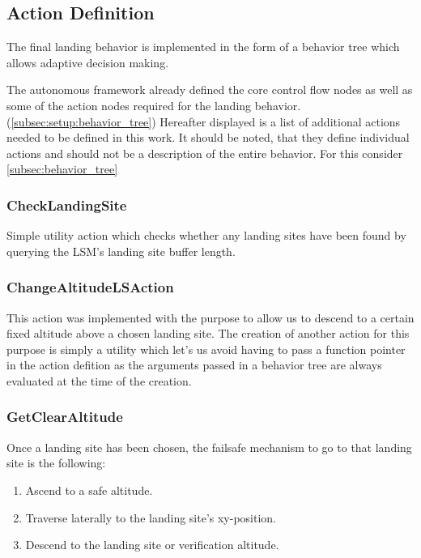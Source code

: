 \subsection{Action Definition}
The final landing behavior is implemented in the form of a behavior tree which allows adaptive decision making.

The autonomous framework already defined the core control flow nodes as well as some of the action nodes required for the landing behavior. (\ref{subsec:setup:behavior_tree}) Hereafter displayed is a list of additional actions needed to be defined in this work. It should be noted, that they define individual actions and should not be a description of the entire behavior. For this consider \cref{subsec:behavior_tree}

\subsubsection{CheckLandingSite}

Simple utility action which checks whether any landing sites have been found by querying the LSM's landing site buffer length.

\subsubsection{ChangeAltitudeLSAction}

This action was implemented with the purpose to allow us to descend to a certain fixed altitude above a chosen landing site. The creation of another action for this purpose is simply a utility which let's us avoid having to pass a function pointer in the action defition as the arguments passed in a behavior tree are always evaluated at the time of the creation.


\subsubsection{GetClearAltitude}
Once a landing site has been chosen, the failsafe mechanism to go to that landing site is the following:

\begin{enumerate}
    \item Ascend to a safe altitude.
    \item Traverse laterally to the landing site's xy-position.
    \item Descend to the landing site or verification altitude.
\end{enumerate}

